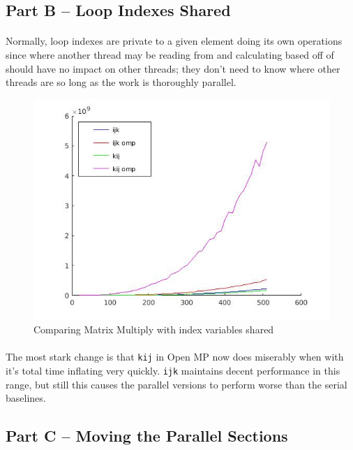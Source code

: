 \documentclass[10pt,8.5in,11in]{article}
\begin{document}
	\pagebreak
	\subsection{Part B -- Loop Indexes Shared}
	\paragraph{}
	Normally, loop indexes are private to a given element doing its own operations since where another thread may be reading from and calculating based off of should have no impact on other threads; they don't need to know where other threads are so long as the work is thoroughly parallel.
	
	\begin{figure}[h!]
	\centering
	\caption{Comparing Matrix Multiply with index variables shared}
	\includegraphics[scale=0.4]{part3b}
	\end{figure}
	
	\paragraph{}
	The most stark change is that \texttt{kij} in Open MP now does miserably when with it's total time inflating very quickly.  \texttt{ijk} maintains decent performance in this range, but still this causes the parallel versions to perform worse than the serial baselines.
	
	\subsection{Part C -- Moving the Parallel Sections}
\end{document}
